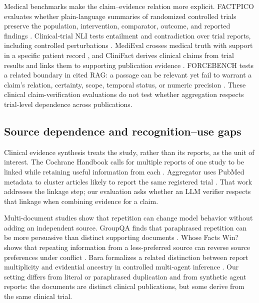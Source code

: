 \documentclass[11pt]{article}
\begin{document}
Medical benchmarks make the claim--evidence relation more explicit. FACTPICO evaluates whether plain-language summaries of randomized controlled trials preserve the population, intervention, comparator, outcome, and reported findings \citep{joseph-etal-2024-factpico}. Clinical-trial NLI tests entailment and contradiction over trial reports, including controlled perturbations \citep{jullien-etal-2024-semeval}. MediEval crosses medical truth with support in a specific patient record \citep{qu-farber-2026-medieval}, and CliniFact derives clinical claims from trial results and links them to supporting publication evidence \citep{zhang-etal-2025-dataset}. FORCEBENCH tests a related boundary in cited RAG: a passage can be relevant yet fail to warrant a claim's relation, certainty, scope, temporal status, or numeric precision \citep{qian-etal-2026-relevant}. These clinical claim-verification evaluations do not test whether aggregation respects trial-level dependence across publications.

\subsection{Source dependence and recognition--use gaps}

Clinical evidence synthesis treats the study, rather than its reports, as the unit of interest. The Cochrane Handbook calls for multiple reports of one study to be linked while retaining useful information from each \citep{li-etal-2024-cochrane}. Aggregator uses PubMed metadata to cluster articles likely to report the same registered trial \citep{smalheiser-holt-2020-aggregator}. That work addresses the linkage step; our evaluation asks whether an LLM verifier respects that linkage when combining evidence for a claim.

Multi-document studies show that repetition can change model behavior without adding an independent source. GroupQA finds that paraphrased repetition can be more persuasive than distinct supporting documents \citep{naphade-2026-rational}. Whose Facts Win? shows that repeating information from a less-preferred source can reverse source preferences under conflict \citep{schuster-etal-2026-whose}. Bara formalizes a related distinction between report multiplicity and evidential ancestry in controlled multi-agent inference \citep{bara-2026-epistemic-sybil}. Our setting differs from literal or paraphrased duplication and from synthetic agent reports: the documents are distinct clinical publications, but some derive from the same clinical trial.
\end{document}

